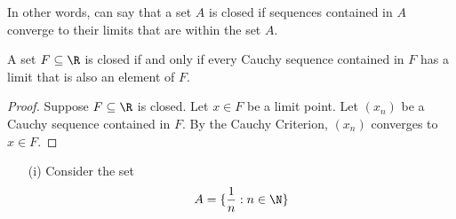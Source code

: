 In other words, can say that a set \( A  \) is closed if sequences contained in \(  A  \) converge to their limits that are within the set \( A  \). 

\begin{tcolorbox}
\begin{thm}
A set \( F \subseteq \R \) is closed if and only if every Cauchy sequence contained in \( F \) has a limit that is also an element of \( F \). 
\end{thm}
\end{tcolorbox}

\begin{proof}
    Suppose \( F \subseteq \R  \) is closed. Let \( x \in F \) be a limit point. Let \( (x_n) \) be a Cauchy sequence contained in \( F  \). By the Cauchy Criterion, \( (x_n) \) converges to \( x \in F  \). 
\end{proof}

\begin{ex}
\begin{enumerate}
    \item[(i)] Consider the set 
        \[ A = \{ \frac{ 1 }{ n } : n \in \N  \}  \]
\end{enumerate}
\end{ex}





